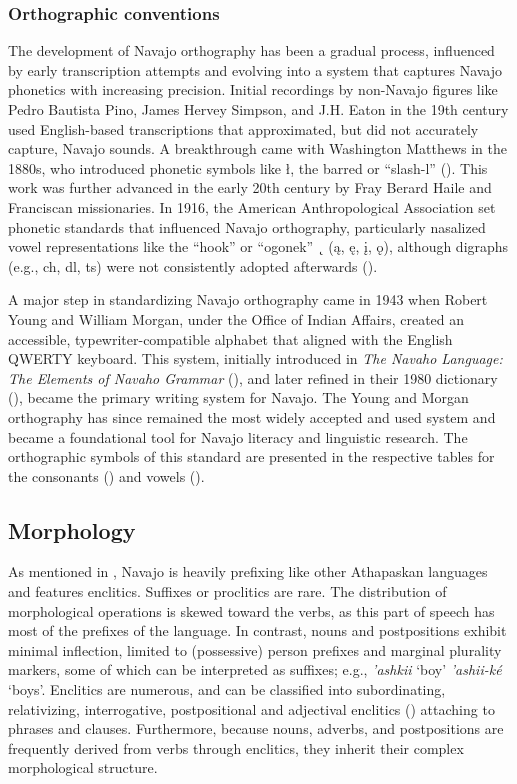 \subsubsection{Orthographic conventions}

The development of Navajo orthography has been a gradual process, influenced by early transcription attempts and evolving into a system that captures Navajo phonetics with increasing precision. Initial recordings by non-Navajo figures like Pedro Bautista Pino, James Hervey Simpson, and J.H. Eaton in the 19th century used English-based transcriptions that approximated, but did not accurately capture, Navajo sounds. A breakthrough came with Washington Matthews in the 1880s, who introduced phonetic symbols like ł, the barred or ``slash-l'' (\cite[53]{Williams:2009om}). This work was further advanced in the early 20th century by Fray Berard Haile and Franciscan missionaries. In 1916, the American Anthropological Association set phonetic standards that influenced Navajo orthography, particularly nasalized vowel representations like the 
``hook'' or ``ogonek'' \ ̨\ (ą, ę, į, ǫ), although digraphs (e.g., ch, dl, ts) were not consistently adopted afterwards (\cite[624]{Herzog:1934hs}).

A major step in standardizing Navajo orthography came in 1943 when Robert Young and William Morgan, under the Office of Indian Affairs, created an accessible, typewriter-compatible alphabet that aligned with the English QWERTY keyboard. This system, initially introduced in \textit{The Navaho Language: The Elements of Navaho Grammar} (\cite{Young:1969qt}), and later refined in their 1980 dictionary (\cite{Young:1980xm}), became the primary writing system for Navajo. The Young and Morgan orthography has since remained the most widely accepted and used system and became a foundational tool for Navajo literacy and linguistic research. The orthographic symbols of this standard are presented in the respective tables for the consonants () and vowels ().

\subsection{Morphology}

As mentioned in , Navajo is heavily prefixing like other Athapaskan languages and features enclitics. Suffixes or proclitics are rare. The distribution of morphological operations is skewed toward the verbs, as this part of speech has most of the prefixes of the language. In contrast, nouns and postpositions exhibit minimal inflection, limited to (possessive) person prefixes and marginal plurality markers, some of which can be interpreted as suffixes; e.g., \textit{'ashkii} `boy' \textit{'ashii-ké} `boys'. Enclitics are numerous, and can be classified into subordinating, relativizing, interrogative, postpositional and adjectival enclitics (\cite[part I:17--23]{Young:1987uj}) attaching to phrases and clauses. Furthermore, because nouns, adverbs, and postpositions are frequently derived from verbs through enclitics, they inherit their complex morphological structure.

